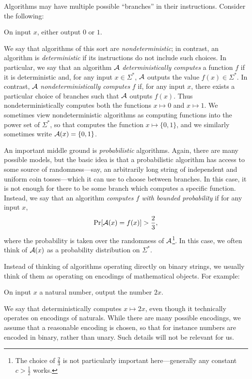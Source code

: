 Algorithms may have multiple possible ``branches'' in their instructions.
Consider the following:

\begin{_algo}\label{alg:nondeterministic}
  On input $x$, either output $0$ or $1$.
\end{_algo}

We say that algorithms of this sort are \emph{nondeterministic}; in contrast, an
algorithm is \emph{deterministic} if its instructions do not include such
choices. In particular, we say that an algorithm $\mathcal{A}$ \emph{deterministically
computes} a function $f$ if it is deterministic and, for any input $x\in
\Sigma^*$, $\mathcal{A}$ outputs the value $f(x)\in\Sigma^*$. In contrast, $\mathcal{A}$
\emph{nondeterministically computes} $f$ if, for any input $x$, there exists a
particular choice of branches such that $\mathcal{A}$ outputs $f(x)$. Thus
 nondeterministically computes both
the functions $x\mapsto 0$ and $x\mapsto 1$. We sometimes view nondeterministic
algorithms as computing functions into the power set of $\Sigma^*$, so that
 computes the function $x\mapsto\{0,
1\}$, and we similarly sometimes write $\mathcal{A}(x) = \{0, 1\}$.

An important middle ground is \emph{probabilistic} algorithms. Again, there are
many possible models, but the basic idea is that a probabilistic algorithm has
access to some source of randomness---say, an arbitrarily long string of
independent and uniform coin tosses---which it can use to choose between
branches. In this case, it is not enough for there to be some branch which
computes a specific function. Instead, we say that an algorithm \emph{computes
$f$ with bounded probability} if for any input $x$, \[
  \Pr[\mathcal{A}(x) = f(x)] > \frac{2}{3},
\]where the probability is taken over the randomness of $\mathcal{A}$\footnote{The
  choice of $\frac{2}{3}$ is not particularly important here---generally any constant
$c>\frac{1}{2}$ works.}. In this case, we
often think of $\mathcal{A}(x)$ as a probability distribution on $\Sigma^*$.

Instead of thinking of algorithms operating directly on binary strings, we
usually think of them as operating on encodings of mathematical objects. For
example:

\begin{_algo}\label{alg:double}
  On input $x$ a natural number, output the number $2x$.
\end{_algo}

We say that  deterministically computes $x\mapsto
2x$, even though it technically operates on encodings of naturals. While there
are many possible encodings, we assume that a reasonable encoding is chosen, so
that for instance numbers are encoded in binary, rather than unary. Such details
will not be relevant for us.

